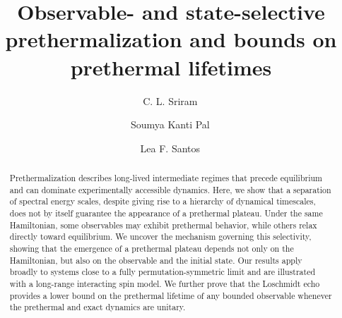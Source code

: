 \documentclass[aps,prl,amsfonts,floatfix,superscriptaddress,longbibliography,twocolumn,footinbib]{revtex4-2}
\begin{document}
\title{Observable- and state-selective prethermalization and bounds on prethermal lifetimes}


\author{C. L. Sriram\,} 

\author{Soumya Kanti Pal\,} 

\author{Lea F. Santos\,} 


\begin{abstract}
Prethermalization describes long-lived intermediate regimes that precede equilibrium and can dominate experimentally accessible dynamics. Here, we show that a separation of spectral energy scales, despite giving rise to a hierarchy of dynamical timescales, does not by itself guarantee the appearance of a prethermal plateau. Under the same Hamiltonian, some observables may exhibit prethermal behavior,  while others relax directly toward equilibrium. We uncover the mechanism governing this selectivity, showing that the emergence of a prethermal plateau depends not only on the Hamiltonian, but also on the observable and the initial state. Our results apply broadly to systems close to a fully permutation-symmetric limit and are illustrated with a long-range interacting spin model. We further prove that the Loschmidt echo provides a lower bound on the prethermal lifetime of any bounded observable whenever the prethermal and exact dynamics are unitary. 
\end{abstract}

\maketitle
\end{document}
